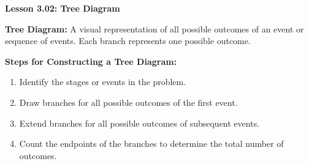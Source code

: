 \begin{center}
\textbf{Lesson 3.02: Tree Diagram}
\end{center}

\vspace*{-1.5ex}

\noindent \textbf{Tree Diagram:} A visual representation of all possible outcomes of an event or sequence of events. Each branch represents one possible outcome.

\noindent   \textbf{Steps for Constructing a Tree Diagram:}
    \begin{enumerate}
        \item Identify the stages or events in the problem.
        \item Draw branches for all possible outcomes of the first event.
        \item Extend branches for all possible outcomes of subsequent events.
        \item Count the endpoints of the branches to determine the total number of outcomes.
    \end{enumerate}
